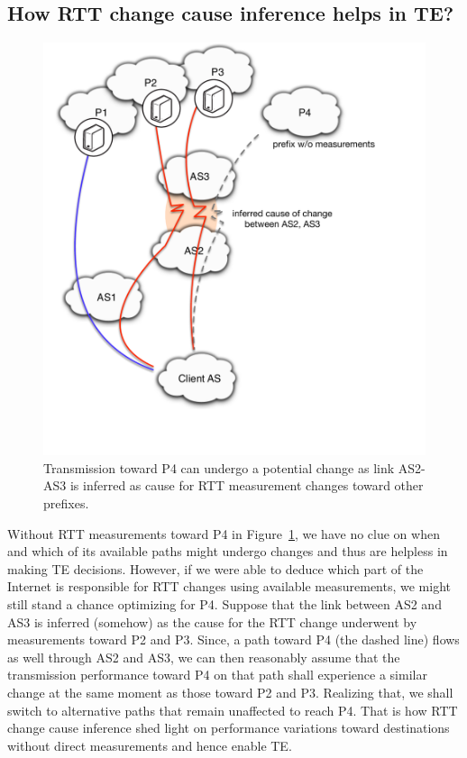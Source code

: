 \subsection{How RTT change cause inference helps in TE?}

\begin{figure}[!htb]
\centering
\includegraphics[width=.7\textwidth]{gfx/chap5/cause_infer_te.pdf}
\caption{Transmission toward P4 can undergo a potential change as link AS2-AS3 is inferred as cause for RTT measurement changes toward other prefixes.}
\label{fig:chap5_cause_infer_te}
\end{figure}

Without RTT measurements toward P4 in Figure~\ref{fig:chap5_cause_infer_te}, we have no clue on when and which of its available paths might undergo changes and thus are helpless in making TE decisions.
However, if we were able to deduce which part of the Internet is responsible for RTT changes using available measurements, we might still stand a chance optimizing for P4.
Suppose that the link between AS2 and AS3 is inferred (somehow) as the cause for the RTT change underwent by measurements toward P2 and P3. 
Since, a path toward P4 (the dashed line) flows as well through AS2 and AS3, we can then reasonably assume that the transmission performance toward P4 on that path shall experience a similar change at the same moment as those toward P2 and P3.
Realizing that, we shall switch to alternative paths that remain unaffected to reach P4.
That is how RTT change cause inference shed light on performance variations toward destinations without direct measurements and hence enable TE.
 
